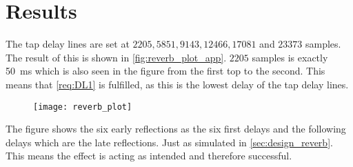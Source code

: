 \section{Results}
The tap delay lines are set at $ 2205, 5851, 9143, 12466, 17081 $ and $ 23373 $ samples. The result of this is shown in \autoref{fig:reverb_plot_app}.
$2205$ samples is exactly \SI{50}{\milli\second} which is also seen in the figure from the first top to the second. This means that \autoref{req:DL1} is fulfilled, as this is the lowest delay of the tap delay lines.

\begin{figure}[htbp]
	\centering
	\texttt{[image: reverb\_plot]}
	\caption{}
	\label{fig:reverb_plot_app}
\end{figure}

The figure shows the six early reflections as the six first delays and the following delays which are the late reflections. Just as simulated in \autoref{sec:design_reverb}. This means the effect is acting as intended and therefore successful.
